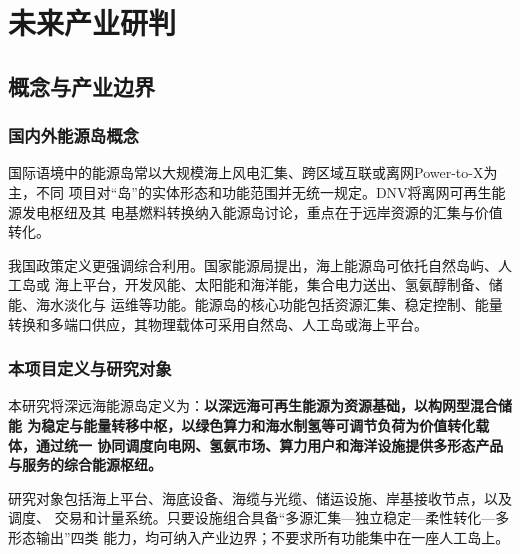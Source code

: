 \chapter{未来产业研判}

\section{概念与产业边界}

\subsection{国内外能源岛概念}

国际语境中的能源岛常以大规模海上风电汇集、跨区域互联或离网Power-to-X为主，不同
项目对“岛”的实体形态和功能范围并无统一规定。DNV将离网可再生能源发电枢纽及其
电基燃料转换纳入能源岛讨论，重点在于远岸资源的汇集与价值转化\cite{dnv-islands}。

我国政策定义更强调综合利用。国家能源局提出，海上能源岛可依托自然岛屿、人工岛或
海上平台，开发风能、太阳能和海洋能，集合电力送出、氢氨醇制备、储能、海水淡化与
运维等功能\cite{nea-energy-island}。能源岛的核心功能包括资源汇集、稳定控制、能量转换和多端口供应，其物理载体可采用自然岛、人工岛或海上平台。

\subsection{本项目定义与研究对象}

本研究将深远海能源岛定义为：\textbf{以深远海可再生能源为资源基础，以构网型混合储能
为稳定与能量转移中枢，以绿色算力和海水制氢等可调节负荷为价值转化载体，通过统一
协同调度向电网、氢氨市场、算力用户和海洋设施提供多形态产品与服务的综合能源枢纽。}

研究对象包括海上平台、海底设备、海缆与光缆、储运设施、岸基接收节点，以及调度、
交易和计量系统。只要设施组合具备“多源汇集—独立稳定—柔性转化—多形态输出”四类
能力，均可纳入产业边界；不要求所有功能集中在一座人工岛上。

